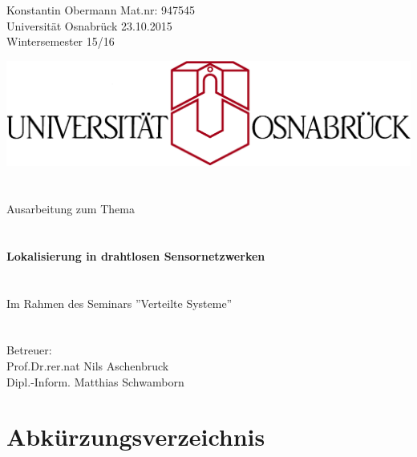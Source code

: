 \documentclass[12pt, a4wide]{scrreprt}
\begin{document}
\noindent
Konstantin Obermann \hfill Mat.nr: 947545\\
Universität Osnabrück \hfill 23.10.2015\\
Wintersemester 15/16\\
\thispagestyle{empty}
\begin{center}
\includegraphics[scale=.9]{uos_proper.png}
\section*{}
{\LARGE Ausarbeitung zum Thema}\\
\section*{}
{\Huge {\bf Lokalisierung in drahtlosen Sensornetzwerken}}\\
\section*{}
{\Large Im Rahmen des Seminars ''Verteilte Systeme''}\\
\section*{}
{\Large Betreuer:}\\
{\Large Prof.Dr.rer.nat Nils Aschenbruck}\\
{\Large Dipl.-Inform. Matthias Schwamborn}\\
\end{center}


\newpage
\thispagestyle{empty}
\section*{Abkürzungsverzeichnis}
 \begin{acronym}
\end{acronym}
\end{document}
